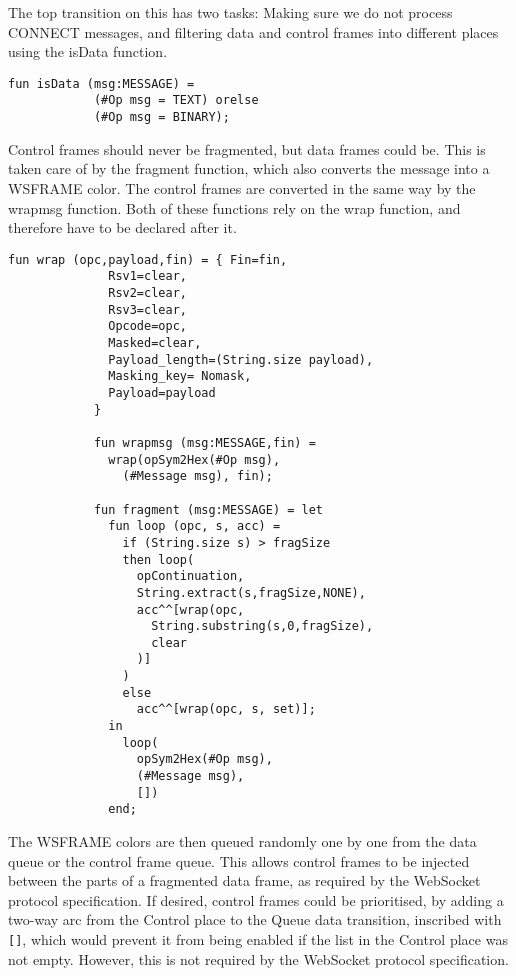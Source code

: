 			The top transition on this has two tasks: Making sure we do not process
			CONNECT messages, and filtering data and control frames into different
			places using the isData function. 
			
			\begin{lstlisting}[label=lst:isData,caption=isData,gobble=3]
			fun isData (msg:MESSAGE) =
			(#Op msg = TEXT) orelse
			(#Op msg = BINARY);
			\end{lstlisting}
			
			Control frames should never be fragmented, but data frames could be. This is
			taken care of by the fragment function, which also converts the message into
			a WSFRAME color. The control frames are converted in the same way by the
			wrapmsg function. Both of these functions rely on the wrap function, and
			therefore have to be declared after it.
			
			
			\begin{lstlisting}[label=lst:fragment,caption=wrap wrapmsg and
			fragment,gobble=3]
			fun wrap (opc,payload,fin) = { Fin=fin,
			  Rsv1=clear,
			  Rsv2=clear,
			  Rsv3=clear,
			  Opcode=opc,
			  Masked=clear,
			  Payload_length=(String.size payload),
			  Masking_key= Nomask,
			  Payload=payload
			}
			
			fun wrapmsg (msg:MESSAGE,fin) = 
			  wrap(opSym2Hex(#Op msg), 
			    (#Message msg), fin);
			    
			fun fragment (msg:MESSAGE) = let
			  fun loop (opc, s, acc) = 
			    if (String.size s) > fragSize
			    then loop(
			      opContinuation,
			      String.extract(s,fragSize,NONE),
			      acc^^[wrap(opc, 
			        String.substring(s,0,fragSize), 
			        clear
			      )]
			    )
			    else 
			      acc^^[wrap(opc, s, set)];
			  in 
			    loop(
			      opSym2Hex(#Op msg), 
			      (#Message msg), 
			      [])
			  end;
			\end{lstlisting}
			
			The WSFRAME colors are then queued randomly one by one from the data queue or
			the control frame queue. This allows control frames to be injected between
			the parts of a fragmented data frame, as required by the WebSocket protocol
			specification. If desired, control frames could be prioritised, by adding a
			two-way arc from the Control place to the Queue data transition, inscribed
			with \lstinline:[]:, which would prevent it from being enabled if the list
			in the Control place was not empty. However, this is not required by the
			WebSocket protocol specification.
		
